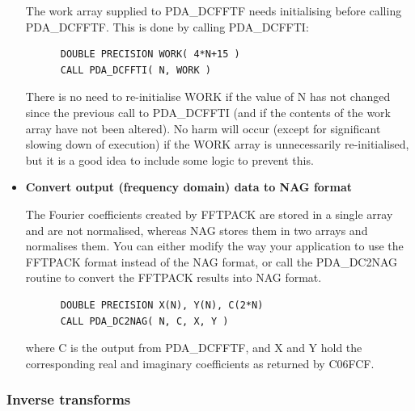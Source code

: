 \documentclass[11pt,twoside]{article}
\newcommand{\htmlref}[2]{#1}
\newcommand{\xlabel}[1]{}
\begin{document}
\begin{itemize}
   The work array supplied to PDA\_DCFFTF needs initialising before calling
   PDA\_DCFFTF. This is done by calling PDA\_DCFFTI:

\begin{verbatim}
      DOUBLE PRECISION WORK( 4*N+15 )
      CALL PDA_DCFFTI( N, WORK )
\end{verbatim}

   There is no need to re-initialise WORK if the value of N has not
   changed since the previous call to PDA\_DCFFTI (and if the contents of the
   work array have not been altered). No harm will occur (except for
   significant slowing down of execution) if the WORK array is
   unnecessarily re-initialised, but it is a good idea to include some
   logic to prevent this.

\item{\bf Convert output (frequency domain) data to NAG format}

   The Fourier coefficients created by FFTPACK are stored in a single
   array and are not normalised, whereas NAG stores them in two arrays
   and normalises them. You can either modify the way your application
   to use the FFTPACK format instead of the NAG format, or call the
\htmlref{PDA\_DC2NAG}{PDA\_C2NAG}
   routine to convert the FFTPACK results into NAG format.

\begin{verbatim}
      DOUBLE PRECISION X(N), Y(N), C(2*N)
      CALL PDA_DC2NAG( N, C, X, Y )
\end{verbatim}

   where C is the output from PDA\_DCFFTF, and X and Y hold the corresponding
   real and imaginary coefficients as returned by C06FCF.

   \end{itemize}


\subsubsection{\xlabel{inverse_transforms}Inverse transforms}
\end{document}
